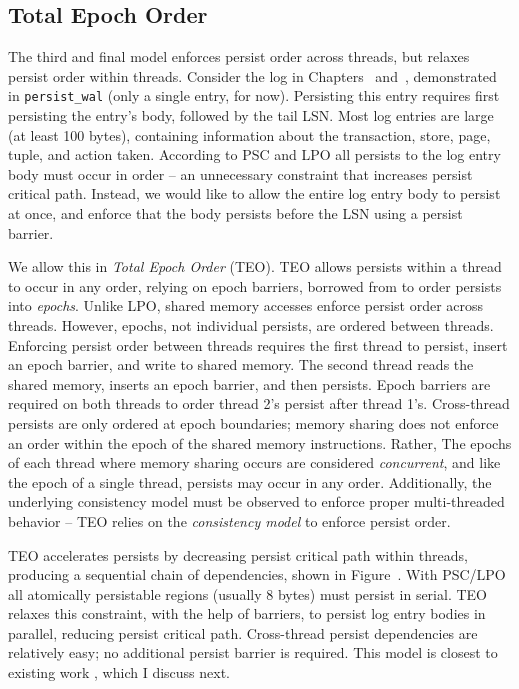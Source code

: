 \subsection{Total Epoch Order}
\label{sec:PMC:PersistenceModels:TEO}

The third and final model enforces persist order across threads, but relaxes persist order within threads.
Consider the log in Chapters~ and~, demonstrated in \texttt{persist\_wal} (only a single entry, for now).
Persisting this entry requires first persisting the entry's body, followed by the tail LSN.
Most log entries are large (at least 100 bytes), containing information about the transaction, store, page, tuple, and action taken.
According to PSC and LPO all persists to the log entry body must occur in order -- an unnecessary constraint that increases persist critical path.
Instead, we would like to allow the entire log entry body to persist at once, and enforce that the body persists before the LSN using a persist barrier.

We allow this in \emph{Total Epoch Order} (TEO).
TEO allows persists within a thread to occur in any order, relying on epoch barriers, borrowed from  to order persists into \emph{epochs}.
Unlike LPO, shared memory accesses enforce persist order across threads.
However, epochs, not individual persists, are ordered between threads.
Enforcing persist order between threads requires the first thread to persist, insert an epoch barrier, and write to shared memory.
The second thread reads the shared memory, inserts an epoch barrier, and then persists.
Epoch barriers are required on both threads to order thread 2's persist after thread 1's.
Cross-thread persists are only ordered at epoch boundaries; memory sharing does not enforce an order within the epoch of the shared memory instructions.
Rather, The epochs of each thread where memory sharing occurs are considered \emph{concurrent}, and like the epoch of a single thread, persists may occur in any order.
Additionally, the underlying consistency model must be observed to enforce proper multi-threaded behavior -- TEO relies on the \emph{consistency model} to enforce persist order.



TEO accelerates persists by decreasing persist critical path within threads, producing a sequential chain of dependencies, shown in Figure~.
With PSC/LPO all atomically persistable regions (usually 8 bytes) must persist in serial.
TEO relaxes this constraint, with the help of barriers, to persist log entry bodies in parallel, reducing persist critical path.
Cross-thread persist dependencies are relatively easy; no additional persist barrier is required.
This model is closest to existing work , which I discuss next.

